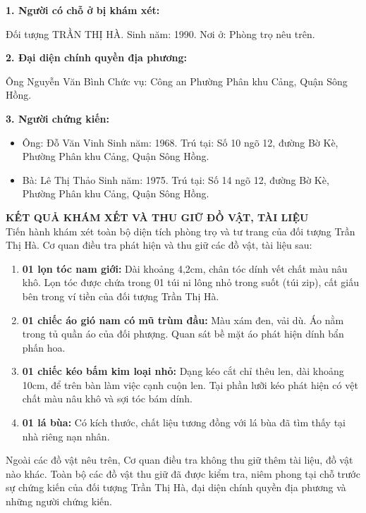 \documentclass[12pt,a4paper]{article}
\begin{document}
\textbf{1. Người có chỗ ở bị khám xét:}


Đối tượng TRẦN THỊ HÀ.    Sinh năm: 1990.     Nơi ở: Phòng trọ nêu trên.


\textbf{2. Đại diện chính quyền địa phương:}


Ông Nguyễn Văn Bình      Chức vụ: Công an Phường Phân khu Cảng, Quận Sông Hồng.


\textbf{3. Người chứng kiến:}

\begin{itemize}[leftmargin=*, itemsep=2pt, topsep=2pt, parsep=0pt]
  \item Ông: Đỗ Văn Vinh     Sinh năm: 1968.     Trú tại: Số 10 ngõ 12, đường Bờ Kè, Phường Phân khu Cảng, Quận Sông Hồng.
  \item Bà: Lê Thị Thảo      Sinh năm: 1975.     Trú tại: Số 14 ngõ 12, đường Bờ Kè, Phường Phân khu Cảng, Quận Sông Hồng.


\end{itemize}

\vspace{0.3cm}\noindent\textbf{\large KẾT QUẢ KHÁM XẾT VÀ THU GIỮ ĐỒ VẬT, TÀI LIỆU}\\[0.15cm]


Tiến hành khám xét toàn bộ diện tích phòng trọ và tư trang của đối tượng Trần Thị Hà. Cơ quan điều tra phát hiện và thu giữ các đồ vật, tài liệu sau:


\begin{enumerate}[label=\arabic*., leftmargin=*, itemsep=2pt, topsep=2pt, parsep=0pt]
  \item \textbf{01 lọn tóc nam giới:} Dài khoảng 4,2cm, chân tóc dính vết chất màu nâu khô. Lọn tóc được chứa trong 01 túi ni lông nhỏ trong suốt (túi zip), cất giấu bên trong ví tiền của đối tượng Trần Thị Hà.
  \item \textbf{01 chiếc áo gió nam có mũ trùm đầu:} Màu xám đen, vải dù. Áo nằm trong tủ quần áo của đối phượng. Quan sát bề mặt áo phát hiện dính bẩn phấn hoa.
  \item \textbf{01 chiếc kéo bấm kim loại nhỏ:} Dạng kéo cắt chỉ thêu len, dài khoảng 10cm, để trên bàn làm việc cạnh cuộn len. Tại phần lưỡi kéo phát hiện có vệt chất màu nâu khô và sợi tóc bám dính.
  \item \textbf{01 lá bùa:} Có kích thước, chất liệu tương đồng với lá bùa đã tìm thấy tại nhà riêng nạn nhân.

\end{enumerate}
Ngoài các đồ vật nêu trên, Cơ quan điều tra không thu giữ thêm tài liệu, đồ vật nào khác. Toàn bộ các đồ vật thu giữ đã được kiểm tra, niêm phong tại chỗ trước sự chứng kiến của đối tượng Trần Thị Hà, đại diện chính quyền địa phương và những người chứng kiến.
\end{document}
